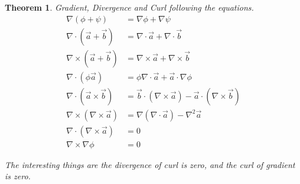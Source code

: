 \documentclass[a4paper]{article}
\newtheorem{theorem}{Theorem}[section]
\begin{document}
\begin{theorem}
    Gradient, Divergence and Curl following the equations.
    \begin{equation}
        \begin{aligned}
            \nabla (\phi + \psi)                  & = \nabla \phi + \nabla \psi                                                     \\
            \nabla \cdot (\vec{a} + \vec{b})      & = \nabla \cdot \vec{a} + \nabla \cdot \vec{b}                                   \\
            \nabla \times (\vec{a} + \vec{b})     & = \nabla \times \vec{a} + \nabla \times \vec{b}                                 \\
            \nabla \cdot (\phi \vec{a})           & = \phi \nabla \cdot \vec{a} + \vec{a} \cdot \nabla \phi                         \\
            \nabla \cdot (\vec{a} \times \vec{b}) & = \vec{b} \cdot (\nabla \times \vec{a}) - \vec{a} \cdot (\nabla \times \vec{b}) \\
            \nabla \times (\nabla \times \vec{a}) & = \nabla (\nabla \cdot \vec{a}) - \nabla^{2} \vec{a}                            \\
            \nabla \cdot (\nabla \times \vec{a})  & = 0                                                                             \\
            \nabla \times \nabla \phi             & = 0
        \end{aligned}
    \end{equation}

    The interesting things are the divergence of curl is zero, and the curl of gradient is zero.
\end{theorem}
\end{document}
